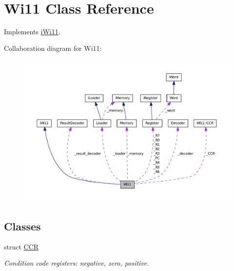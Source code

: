 \hypertarget{classWi11}{
\section{Wi11 Class Reference}
\label{classWi11}
}


Implements \hyperlink{classiWi11}{iWi11}.  




Collaboration diagram for Wi11:
\nopagebreak
\begin{figure}[H]
\begin{center}
\leavevmode
\includegraphics[width=400pt]{classWi11__coll__graph}
\end{center}
\end{figure}
\subsection*{Classes}
\begin{DoxyCompactItemize}
\item 
struct \hyperlink{structWi11_1_1CCR}{CCR}
\begin{DoxyCompactList}\small\item\em Condition code registers: negative, zero, positive. \item\end{DoxyCompactList}\end{DoxyCompactItemize}
